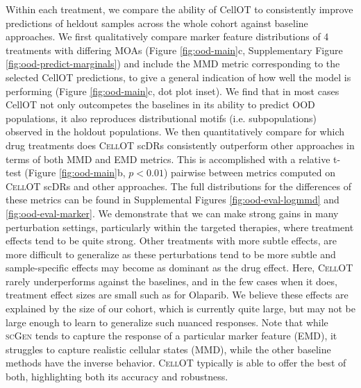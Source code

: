 Within each treatment, we compare the ability of CellOT to consistently improve predictions of heldout samples across the whole cohort against baseline approaches.
We first qualitatively compare marker feature distributions of 4 treatments with differing MOAs (Figure \ref{fig:ood-main}c, Supplementary Figure \ref{fig:ood-predict-marginals}) and include the MMD metric corresponding to the selected CellOT predictions, to give a general indication of how well the model is performing (Figure \ref{fig:ood-main}c, dot plot inset).
We find that in most cases CellOT not only outcompetes the baselines in its ability to predict OOD populations, it also reproduces distributional motifs (i.e. subpopulations) observed in the holdout populations.
We then quantitatively compare for which drug treatments does \textsc{CellOT} scDRs consistently outperform other approaches in terms of both MMD and EMD metrics.
This is accomplished with a relative t-test (Figure \ref{fig:ood-main}b, $p < 0.01$) pairwise between metrics computed on \textsc{CellOT} scDRs and other approaches.
The full distributions for the differences of these metrics can be found in Supplemental Figures \ref{fig:ood-eval-logmmd} and \ref{fig:ood-eval-marker}.
We demonstrate that we can make strong gains in many perturbation settings, particularly within the targeted therapies, where treatment effects tend to be quite strong.
Other treatments with more subtle effects, are more difficult to generalize as these perturbations tend to be more subtle and sample-specific effects may become as dominant as the drug effect.
Here, \textsc{CellOT} rarely underperforms against the baselines, and in the few cases when it does, treatment effect sizes are small such as for Olaparib.
We believe these effects are explained by the size of our cohort, which is currently quite large, but may not be large enough to learn to generalize such nuanced responses.
Note that while \textsc{scGen} tends to capture the response of a particular marker feature (EMD), it struggles to capture realistic cellular states (MMD), while the other baseline methods have the inverse behavior.
\textsc{CellOT} typically is able to offer the best of both, highlighting both its accuracy and robustness.

